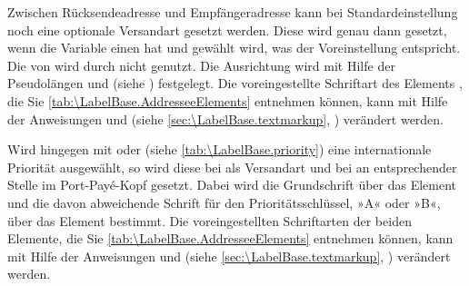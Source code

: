 \BeginIndexGroup
{}
Zwischen Rücksendeadresse und Empfängeradresse kann bei Standardeinstellung  noch eine optionale
Versandart gesetzt werden. Diese wird genau dann gesetzt,
wenn die Variable  einen  hat und
 gewählt
wird, was der Voreinstellung entspricht. Die  von
 wird durch  nicht genutzt. Die
Ausrichtung wird mit Hilfe der Pseudolängen  und
 (siehe
) festgelegt. Die
voreingestellte Schriftart des Elements
, die Sie
\autoref{tab:\LabelBase.AddresseeElements} entnehmen können, kann mit Hilfe
der Anweisungen  und
 (siehe
\autoref{sec:\LabelBase.textmarkup}, )
verändert werden.%
\EndIndexGroup

\BeginIndexGroup
{}%
%
Wird hingegen mit
 oder  (siehe
\autoref{tab:\LabelBase.priority}) eine internationale Priorität ausgewählt,
so wird diese bei  als Versandart und bei
 an
entsprechender Stelle im Port-Payé-Kopf gesetzt. Dabei wird die
Grundschrift über das Element  und die
davon abweichende Schrift für den Prioritätsschlüssel, »A« oder »B«, über das
Element  bestimmt. Die voreingestellten Schriftarten
der beiden Elemente, die Sie \autoref{tab:\LabelBase.AddresseeElements}
entnehmen können, kann mit Hilfe der Anweisungen
 und
 (siehe
\autoref{sec:\LabelBase.textmarkup}, )
verändert werden.%
\EndIndexGroup

